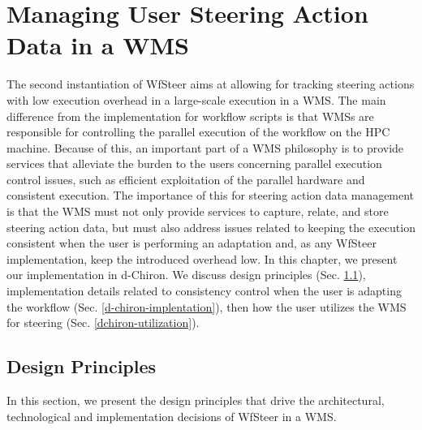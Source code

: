 \chapter{Managing User Steering Action Data in a WMS} \label{chap_dchiron}

The second instantiation of WfSteer 
aims at allowing for tracking steering actions with low execution overhead in a large-scale execution in a WMS.
The main difference from the implementation for workflow scripts is that
WMSs are responsible for controlling the parallel execution of the workflow
on the HPC machine. Because of this, an important part of a WMS philosophy
is to provide services that alleviate the burden to the users concerning
parallel execution control issues, such as efficient exploitation of the parallel hardware
and consistent execution. The importance of this for steering action data management
is that the WMS must not only provide services to capture, relate, and store
steering action data, but must also address issues related to keeping the execution
consistent when the user is performing an adaptation and, as any WfSteer implementation,
keep the introduced overhead low.
In this chapter, we present our implementation in d-Chiron.
We discuss design principles (Sec. \ref{d-chiron-design-principles}),
implementation details related to consistency control when the user is adapting the workflow (Sec. \ref{d-chiron-implentation}),
then how the user utilizes the WMS for steering (Sec. \ref{dchiron-utilization}).




\section{Design Principles}
\label{d-chiron-design-principles}

In this section, we present the design principles that drive
the architectural, technological and implementation decisions of WfSteer in a WMS.

